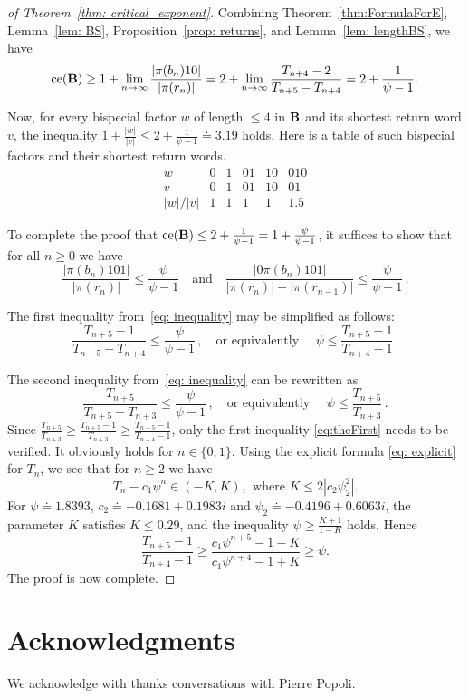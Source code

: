 \documentclass[
final
]{dmtcs-episciences}
\DeclareMathOperator{\ce}{ce}
\theoremstyle{plain}
\theoremstyle{definition}
\theoremstyle{remark}
\begin{document}
\begin{proof}[of Theorem~\ref{thm: critical_exponent}]
Combining Theorem~\ref{thm:FormulaForE}, Lemma~\ref{lem: BS}, Proposition~\ref{prop: returns}, and Lemma~\ref{lem: lengthBS}, we have
 $$\ce({\bf B})\geq 1+\lim_{n\to\infty}\frac{|\pi(b_n)10|}{|\pi(r_n)|}=2+\lim_{n\to \infty}\frac{T_{n+4}-2}{T_{n+5}-T_{n+4}}=2+\frac{1}{\psi-1} . $$

 Now, for every bispecial factor $w$ of length $\leq 4$ in $\bf B$ and its shortest return word $v$, the inequality $1+\frac{|w|}{|v|}\leq 2+\frac{1}{\psi-1}\doteq 3.19$ holds.
Here is a table of such bispecial factors and their shortest return words.
$$\begin{array}{c|c|c|c|c|c}
    w &  0 & 1 & 01 & 10 & 010 \\ \hline
    v & 0 &  1 & 01 & 10 & 01 \\ \hline
    |w|/|v| & 1 & 1 & 1 & 1& 1.5 
\end{array}$$

To complete the proof that $\ce({\bf B})\leq 2+\frac{1}{\psi-1}=1+\frac{\psi}{\psi-1}$, it suffices to show that for all $n\geq 0$  we have
\begin{equation}\label{eq: inequality}
\frac{|\pi(b_n)101|}{|\pi(r_n)|}\leq \frac{\psi}{\psi-1}\quad \text{and} \quad \frac{|0\pi(b_n)101|}{|\pi(r_n)|+|\pi(r_{n-1})|}\leq \frac{\psi}{\psi-1}\,.
\end{equation}

The first inequality from~\eqref{eq: inequality} may be simplified as follows:
\begin{equation}\label{eq:theFirst}
\frac{T_{n+5}-1}{T_{n+5}-T_{n+4}}\leq \frac{\psi}{\psi-1}\,,\quad \text{or equivalently }\quad \psi  \leq  \frac{T_{n+5}-1}{T_{n+4}-1}\,.
\end{equation}

The second inequality from~\eqref{eq: inequality} can be rewritten as 
$$
\frac{T_{n+5}}{T_{n+5}-T_{n+3}}\leq \frac{\psi}{\psi-1}\,, \quad \text{or equivalently } \quad  
\psi \leq  \frac{T_{n+5}}{T_{n+3}}\,.
$$
Since $\frac{T_{n+5}}{T_{n+3}}\geq \frac{T_{n+5}-1}{T_{n+3}} \geq \frac{T_{n+5}-1}{T_{n+4}-1} $, only the first inequality \eqref{eq:theFirst} needs to be verified. It obviously holds for $n\in \{0,1\}$.
Using the explicit formula  \eqref{eq: explicit} for  $T_n$, we see that for $n \geq 2$ we have
$$T_n - c_1 \psi^n \in (-K, K),\ \  \text{where }K  \leq  2|c_2\psi^2_2| .
$$
For  $\psi\doteq 1.8393 $, 
$c_2\doteq -0.1681+0.1983i$ and $\psi_2\doteq -0.4196+ 0.6063i$, the parameter $K$ satisfies $K \leq 0.29$, and 
the inequality  $\psi\geq \frac{K+1}{1-K}$ holds. Hence 
  $$ \frac{T_{n+5}-1}{T_{n+4} - 1}\geq \frac{c_1\psi^{n+5} -1-K}{c_1\psi^{n+4} - 1 + K} \geq \psi .$$ 
The proof is now complete.
\end{proof}

\section{Acknowledgments}

We acknowledge with thanks conversations with Pierre Popoli.

\nocite{*}

%

\label{sec:biblio}
\end{document}
